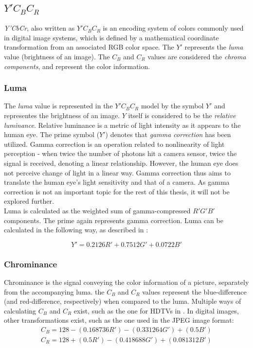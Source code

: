 \documentclass[thesis=M,english]{FITthesis}[2012/10/20]
\begin{document}
\subsection{$Y'C_{B}C_{R}$}
\emph{Y'CbCr}, also written as $Y'C_{B}C_{R}$ is an encoding system of colors commonly
used in digital image systems, which is defined by a mathematical coordinate
transformation from an associated RGB color space. The $Y'$ represents the
\emph{luma} value (brightness of an image). The $C_{B}$ and $C_{R}$ values
are considered the \emph{chroma components}, and represent the color information.


\subsubsection{Luma}
The \emph{luma} value is represented in the $Y'C_{B}C_{R}$ model by the symbol $Y'$
and representes the brightness of an image. $Y$ itself is considered to be the \emph{relative
luminance}. Relative luminance is a metric of light intensity as it appears to the human eye.
The prime symbol ($Y'$) denotes that \emph{gamma correction} has been utilized. Gamma correction
is an operation related to nonlinearity of light perception - when twice the number of
photons hit a camera sensor, twice the signal is received, denoting a linear relationship.
However, the human eye does not perceive change of light in a linear way. Gamma correction
thus aims to translate the human eye's light sensitivity and that of a camera. \cite{img:gamma}
As gamma correction is not an important topic for the rest of this thesis, it will not be
explored further.
\\

Luma is calculated as the weighted sum of gamma-compressed $R'G'B'$ components. The prime
again represents gamma correction. Luma can be calculated in the following way, as described in
\cite{img:rec-709}:

\begin{equation}
  \label{formula:luma}
  Y' = 0.2126R' + 0.7512G' + 0.0722B'
\end{equation}

\subsubsection{Chrominance}
Chrominance is the signal conveying the color information of a picture, separately
from the accompanying luma. the $C_{B}$ and $C_{R}$ values represent the blue-difference
(and red-difference, respectively) when compared to the luma.
Multiple ways of calculating $C_{B}$ and $C_{R}$ exist, such as the one for HDTVs in \cite{img:rec-709}.
In digital images, other transformations exist, such as the one used in the JPEG image format:
\begin{equation}
  \begin{aligned}
    C_B = 128 - (0.168736R') - (0.331264G') + (0.5B')\\
    C_R = 128 + (0.5R') - (0.418688G') + (0.081312B')
  \end{aligned}
\end{equation}
\cite{jfif}
\end{document}
